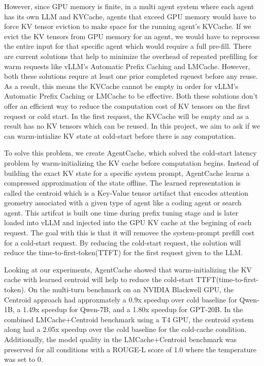 \documentclass[letterpaper,twocolumn,10pt]{article}
\begin{document}
However, since GPU memory is finite, in a multi agent system where each agent has its own LLM and KVCache, agents that exceed GPU memory would have to force KV tensor eviction to make space for the running agent's KVCache. If we evict the KV tensors from GPU memory for an agent, we would have to reprocess the entire input for that specific agent which would require a full pre-fill. There are current solutions that help to minimize the overhead of repeated prefilling for warm requests like vLLM's Automatic Prefix Caching and LMCache. However, both these solutions requre at least one prior completed rqeuest before any reuse. As a result, this means the KVCache cannot be empty in order for vLLM's Automatic Prefix Caching or LMCache to be effective. Both these solutions don't offer an efficient way to reduce the computation cost of KV tensors on the first request or cold start. In the first request, the KVCache will be empty and as a result has no KV tensors which can be reused. In this project, we aim to ask if we can warm-intialize KV state at cold-start before there is any computation.

To solve this problem, we create AgentCache, which solved the cold-start latency problem by warm-initializing the KV cache before computation begins. Instead of building the exact KV state for a specific system prompt, AgentCache learns a compressed approximation of the state offline. The learned representation is called the centroid which is a Key-Value tensor artifact that encodes attention geometry associated with a given type of agent like a coding agent or search agent. This artifcat is built one time during prefix tuning stage and is later loaded into vLLM and injected into the GPU KV cache at the begining of each request. The goal with this is that it will removee the system-prompt prefill cost for a cold-start request. By reducing the cold-start request, the solution will reduce the time-to-first-token(TTFT) for the first request given to the LLM.

Looking at our experiments, AgentCache showed that warm-initializing the KV cache with learned centroid will help to reduce the cold-start TTFT(time-to-first-token). On the multi-turn benchmark on an NVIDIA Blackwell GPU, the Centroid approach had approxmately a 0.9x speedup over cold baseline for Qwen-1B, a 1.49x speedup for Qwen-7B, and a 1.80x speedup for GPT-20B. In the combined LMCache+Centroid benchmark using a T4 GPU, the centroid system along had a 2.05x speedup over the cold baseline for the cold-cache condition. Additionally, the model quality in the LMCache+Centroid benchmark was preserved for all conditions with a ROUGE-L score of 1.0 where the temperature was set to 0.
\end{document}
